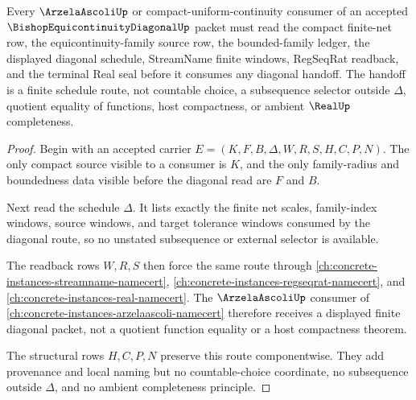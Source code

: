 \begin{theorem}
\label{thm:bishop-equicontinuity-diagonal-finite-net-route}
Every $\ArzelaAscoliUp$ or compact-uniform-continuity consumer of an accepted $\BishopEquicontinuityDiagonalUp$ packet must read the compact finite-net row, the equicontinuity-family source row, the bounded-family ledger, the displayed diagonal schedule, StreamName finite windows, RegSeqRat readback, and the terminal Real seal before it consumes any diagonal handoff. The handoff is a finite schedule route, not countable choice, a subsequence selector outside $\Delta$, quotient equality of functions, host compactness, or ambient $\RealUp$ completeness.
\end{theorem}
\begin{proof}
Begin with an accepted carrier $E=(K,F,B,\Delta,W,R,S,H,C,P,N)$. The only compact source visible to a consumer is $K$, and the only family-radius and boundedness data visible before the diagonal read are $F$ and $B$.

Next read the schedule $\Delta$. It lists exactly the finite net scales, family-index windows, source windows, and target tolerance windows consumed by the diagonal route, so no unstated subsequence or external selector is available.

The readback rows $W,R,S$ then force the same route through \autoref{ch:concrete-instances-streamname-namecert}, \autoref{ch:concrete-instances-regseqrat-namecert}, and \autoref{ch:concrete-instances-real-namecert}. The $\ArzelaAscoliUp$ consumer of \autoref{ch:concrete-instances-arzelaascoli-namecert} therefore receives a displayed finite diagonal packet, not a quotient function equality or a host compactness theorem.

The structural rows $H,C,P,N$ preserve this route componentwise. They add provenance and local naming but no countable-choice coordinate, no subsequence outside $\Delta$, and no ambient completeness principle.
\end{proof}

